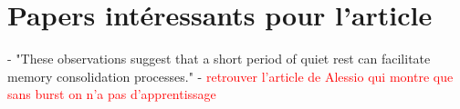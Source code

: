 \section{Papers intéressants pour l'article}
- \citep{brokaw_resting_2016} "These observations suggest that a short period of quiet rest can facilitate memory consolidation processes."
- \textcolor{red}{retrouver l'article de Alessio qui montre que sans burst on n'a pas d'apprentissage}

